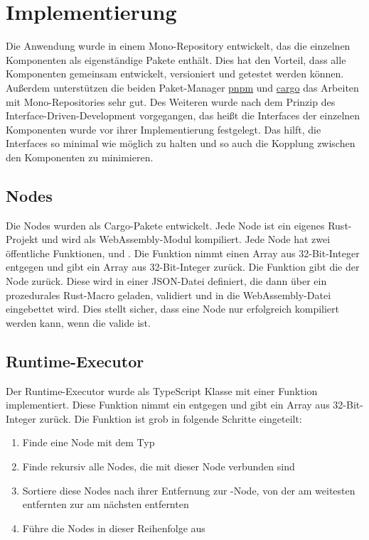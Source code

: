 \documentclass[ngerman]{article}
\begin{document}
\section{Implementierung}
Die Anwendung wurde in einem Mono-Repository entwickelt, das die einzelnen Komponenten als eigenständige Pakete enthält. Dies hat den Vorteil, dass alle Komponenten gemeinsam entwickelt, versioniert und getestet werden können. \cite{GithubRepo}
\br
Außerdem unterstützen die beiden Paket-Manager \href{https://pnpm.io/}{pnpm} und \href{https://crates.io/}{cargo} das Arbeiten mit 
Mono-Repositories sehr gut. 
\br
Des Weiteren wurde nach dem Prinzip des Interface-Driven-Development vorgegangen, das heißt die Interfaces der einzelnen Komponenten wurde vor ihrer Implementierung festgelegt. Das hilft, die Interfaces so minimal wie möglich zu halten und so auch die Kopplung zwischen den Komponenten zu minimieren.

\subsection{Nodes}
Die Nodes wurden als Cargo-Pakete entwickelt. Jede Node ist ein eigenes Rust-Projekt und wird als WebAssembly-Modul kompiliert.
\br
Jede Node hat zwei öffentliche Funktionen,  und . Die  Funktion nimmt einen Array aus 32-Bit-Integer entgegen und gibt ein Array aus 32-Bit-Integer zurück. 
\br
Die  Funktion gibt die  der Node zurück. 
Diese  wird in einer JSON-Datei definiert, die dann über ein prozedurales Rust-Macro geladen, validiert und in die WebAssembly-Datei eingebettet wird. Dies stellt sicher, dass eine Node nur erfolgreich kompiliert werden kann, wenn die  valide ist.

\subsection{Runtime-Executor}
Der Runtime-Executor wurde als TypeScript Klasse mit einer  Funktion implementiert. Diese  Funktion nimmt ein  entgegen und gibt ein Array aus 32-Bit-Integer zurück. Die Funktion ist grob in folgende Schritte eingeteilt:

\begin{enumerate}
  \item Finde eine Node mit dem Typ 
  \item Finde rekursiv alle Nodes, die mit dieser Node verbunden sind
  \item Sortiere diese Nodes nach ihrer Entfernung zur -Node, von der am weitesten entfernten zur am nächsten entfernten
  \item Führe die Nodes in dieser Reihenfolge aus
\end{enumerate}
\end{document}
